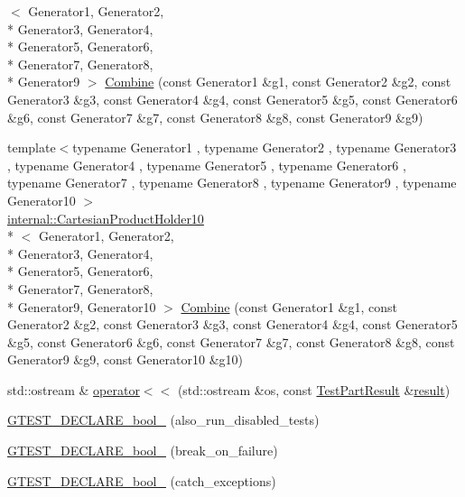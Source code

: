 \begin{DoxyCompactItemize}
$<$ Generator1, Generator2, \\*
Generator3, Generator4, \\*
Generator5, Generator6, \\*
Generator7, Generator8, \\*
Generator9 $>$ \hyperlink{namespacetesting_a928ed7d1e8dd1dde0da5d7d3838384d2}{Combine} (const Generator1 \&g1, const Generator2 \&g2, const Generator3 \&g3, const Generator4 \&g4, const Generator5 \&g5, const Generator6 \&g6, const Generator7 \&g7, const Generator8 \&g8, const Generator9 \&g9)
\item 
{\footnotesize template$<$typename Generator1 , typename Generator2 , typename Generator3 , typename Generator4 , typename Generator5 , typename Generator6 , typename Generator7 , typename Generator8 , typename Generator9 , typename Generator10 $>$ }\\\hyperlink{classtesting_1_1internal_1_1CartesianProductHolder10}{internal\-::\-Cartesian\-Product\-Holder10}\\*
$<$ Generator1, Generator2, \\*
Generator3, Generator4, \\*
Generator5, Generator6, \\*
Generator7, Generator8, \\*
Generator9, Generator10 $>$ \hyperlink{namespacetesting_a0590cd15c5bafaea9f5d2b1061e0a28b}{Combine} (const Generator1 \&g1, const Generator2 \&g2, const Generator3 \&g3, const Generator4 \&g4, const Generator5 \&g5, const Generator6 \&g6, const Generator7 \&g7, const Generator8 \&g8, const Generator9 \&g9, const Generator10 \&g10)
\item 
std\-::ostream \& \hyperlink{namespacetesting_a266e39b7c4691fedb856047673a412d8}{operator$<$$<$} (std\-::ostream \&os, const \hyperlink{classtesting_1_1TestPartResult}{Test\-Part\-Result} \&\hyperlink{legacy_8hpp_a0bb77d54f6769867cfdf389897bd8e43}{result})
\item 
\hyperlink{namespacetesting_a4c08ba9fcb0581c61e25968e520efa48}{G\-T\-E\-S\-T\-\_\-\-D\-E\-C\-L\-A\-R\-E\-\_\-bool\-\_\-} (also\-\_\-run\-\_\-disabled\-\_\-tests)
\item 
\hyperlink{namespacetesting_a5868c3980b2f69f511fc8c3de7cdfc17}{G\-T\-E\-S\-T\-\_\-\-D\-E\-C\-L\-A\-R\-E\-\_\-bool\-\_\-} (break\-\_\-on\-\_\-failure)
\item 
\hyperlink{namespacetesting_ab6f1777f7b740f31e41f7da017447b58}{G\-T\-E\-S\-T\-\_\-\-D\-E\-C\-L\-A\-R\-E\-\_\-bool\-\_\-} (catch\-\_\-exceptions)
\item 

\end{DoxyCompactItemize}
